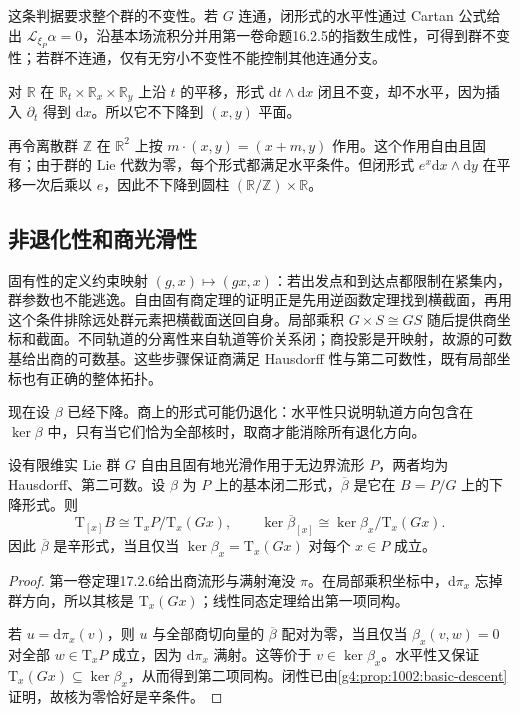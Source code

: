 这条判据要求整个群的不变性。若 \(G\) 连通，闭形式的水平性通过 Cartan 公式给出 \(\mathcal L_{\xi_P}\alpha=0\)，沿基本场流积分并用第一卷命题16.2.5的指数生成性，可得到群不变性；若群不连通，仅有无穷小不变性不能控制其他连通分支。

\begin{example}\label{g4:exm:1002:descent-conditions}
	对 \(\mathbb R\) 在 \(\mathbb R_t\times\mathbb R_x\times\mathbb R_y\) 上沿 \(t\) 的平移，形式 \(\mathrm{d}t\wedge\mathrm{d}x\) 闭且不变，却不水平，因为插入 \(\partial_t\) 得到 \(\mathrm{d}x\)。所以它不下降到 \((x,y)\) 平面。

	再令离散群 \(\mathbb Z\) 在 \(\mathbb R^2\) 上按 \(m\cdot(x,y)=(x+m,y)\) 作用。这个作用自由且固有；由于群的 Lie 代数为零，每个形式都满足水平条件。但闭形式 \(e^x\mathrm{d}x\wedge\mathrm{d}y\) 在平移一次后乘以 \(e\)，因此不下降到圆柱 \((\mathbb R/\mathbb Z)\times\mathbb R\)。
\end{example}

\subsection{非退化性和商光滑性}
\label{g4:subsec:1002:04}

固有性的定义约束映射 \((g,x)\mapsto(gx,x)\)：若出发点和到达点都限制在紧集内，群参数也不能逃逸。自由固有商定理的证明正是先用逆函数定理找到横截面，再用这个条件排除远处群元素把横截面送回自身。局部乘积 \(G\times S\cong GS\) 随后提供商坐标和截面。不同轨道的分离性来自轨道等价关系闭；商投影是开映射，故源的可数基给出商的可数基。这些步骤保证商满足 Hausdorff 性与第二可数性，既有局部坐标也有正确的整体拓扑。

\ProseParagraphBreak

现在设 \(\beta\) 已经下降。商上的形式可能仍退化：水平性只说明轨道方向包含在 \(\ker\beta\) 中，只有当它们恰为全部核时，取商才能消除所有退化方向。

\begin{proposition}\label{g4:prop:1002:quotient-nondegeneracy}
	设有限维实 Lie 群 \(G\) 自由且固有地光滑作用于无边界流形 \(P\)，两者均为 Hausdorff、第二可数。设 \(\beta\) 为 \(P\) 上的基本闭二形式，\(\overline\beta\) 是它在 \(B=P/G\) 上的下降形式。则
	\begin{equation}\label{g4:eq:1002:quotient-tangent}
		\mathrm{T}_{[x]}B\cong
		\mathrm{T}_xP/\mathrm{T}_x(Gx),
		\qquad
		\ker\overline\beta_{[x]}
		\cong\ker\beta_x/\mathrm{T}_x(Gx).
	\end{equation}
	因此 \(\overline\beta\) 是辛形式，当且仅当 \(\ker\beta_x=\mathrm{T}_x(Gx)\) 对每个 \(x\in P\) 成立。
\end{proposition}
\begin{proof}
	第一卷定理17.2.6给出商流形与满射淹没 \(\pi\)。在局部乘积坐标中，\(\mathrm{d}\pi_x\) 忘掉群方向，所以其核是 \(\mathrm{T}_x(Gx)\)；线性同态定理给出第一项同构。

	若 \(u=\mathrm{d}\pi_x(v)\)，则 \(u\) 与全部商切向量的 \(\overline\beta\) 配对为零，当且仅当 \(\beta_x(v,w)=0\) 对全部 \(w\in\mathrm{T}_xP\) 成立，因为 \(\mathrm{d}\pi_x\) 满射。这等价于 \(v\in\ker\beta_x\)。水平性又保证 \(\mathrm{T}_x(Gx)\subseteq\ker\beta_x\)，从而得到第二项同构。闭性已由\cref{g4:prop:1002:basic-descent}证明，故核为零恰好是辛条件。
\end{proof}

